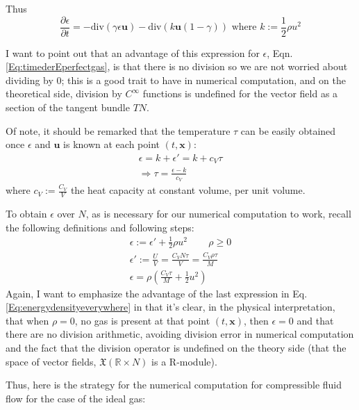 \documentclass[10pt]{amsart}
\begin{document}
\begin{multicols*}{2}
Thus
\begin{equation}\label{Eq:timederEperfectgas}
  \boxed{ \frac{ \partial \epsilon }{ \partial t} = -\text{div}(\gamma \epsilon \mathbf{u} ) - \text{div}(k \mathbf{u}(1-\gamma) ) } \text{ where } k := \frac{1}{2} \rho u^2
  \end{equation}

I want to point out that an advantage of this expression for $\epsilon$, Eqn. \ref{Eq:timederEperfectgas}, is that there is no division so we are not worried about dividing by $0$; this is a good trait to have in numerical computation, and on the theoretical side, division by $C^{\infty}$ functions is undefined for the vector field as a section of the tangent bundle $TN$.  

Of note, it should be remarked that the temperature $\tau$ can be easily obtained once $\epsilon$ and $\mathbf{u}$ is known at each point $(t,\mathbf{x})$:
\[
\begin{gathered}
  \epsilon = k + \epsilon' = k + c_V \tau \\ 
  \Longrightarrow \boxed{  \tau = \frac{ \epsilon - k }{ c_V} }
  \end{gathered}
\]
where $c_V := \frac{C_V}{V}$ the heat capacity at constant volume, per unit volume.

To obtain $\epsilon$ over $N$, as is necessary for our numerical computation to work, recall the following definitions and following steps:
\begin{equation}\label{Eq:energydensityeverywhere}
\begin{gathered}
  \epsilon := \epsilon' + \frac{1}{2} \rho u^2 \qquad \, \rho \geq 0 \\ 
  \epsilon' := \frac{U}{V} = \frac{C_V N \tau}{ V} =\frac{ C_V \rho \tau }{ M } \\
\boxed{  \epsilon = \rho \left( \frac{C_V \tau}{M} + \frac{1}{2} u^2 \right) }
\end{gathered}
\end{equation}
Again, I want to emphasize the advantage of the last expression in Eq. \ref{Eq:energydensityeverywhere} in that it's clear, in the physical interpretation, that when $\rho =0$, no gas is present at that point $(t,\mathbf{x})$, then $\epsilon=0$ and that there are no division arithmetic, avoiding division error in numerical computation and the fact that the division operator is undefined on the theory side (that the space of vector fields, $\mathfrak{X}(\mathbb{R}\times N)$ is a R-module).  

Thus, here is the strategy for the numerical computation for compressible fluid flow for the case of the ideal gas:


\end{multicols*}
\end{document}
